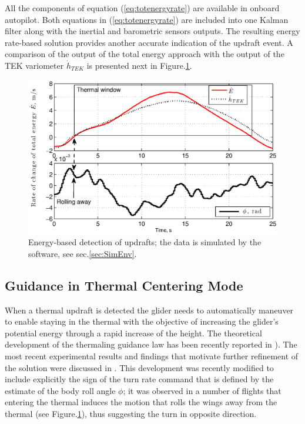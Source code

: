 \documentclass{ifacconf}
\newcommand{\squeezeup}{\vspace{-2.0mm}}
\begin{document}
All the components of equation (\ref{eq:totenergyrate}) are available in
onboard autopilot. Both equations in (\ref{eq:totenergyrate}) are included
into one Kalman filter along with the inertial and barometric sensors
outputs. The resulting energy rate-based solution provides another accurate
indication of the updraft event. A comparison of the output of the total
energy approach with the output of the TEK variometer $\dot{h}_{TEK}$ is
presented next in Figure.\ref{fig:ThermalDetection}.
\begin{figure}[thpb]
  \centering
  \includegraphics[scale=0.44]{Figures/TEK_Bank.eps}
  \caption{Energy-based detection of updrafts; the data is simulated
  by the~\cite{Condor:2013:Online} software, see sec.\ref{sec:SimEnv}.}
  \label{fig:ThermalDetection}
\end{figure}

\subsection{Guidance in Thermal Centering Mode}
\label{subsec:ThermGuidance}
\squeezeup

When a thermal updraft is detected the glider needs to automatically maneuver
to enable staying in the thermal with the objective of increasing the
glider's potential energy through a rapid increase of the height. The
theoretical development of the thermaling guidance law has been recently
reported in \cite{AKlass_JGCD:2012}). The most recent experimental results
and findings that motivate further refinement of the solution were discussed
in \cite{AKlass_CDC:2012}. This development was recently modified to include
explicitly the sign of the turn rate command that is defined by the estimate
of the body roll angle $\phi$; it was observed in a number of flights that
entering the thermal induces the motion that rolls the wings away from the
thermal (see Figure.\ref{fig:ThermalDetection}), thus suggesting the turn in
opposite direction.
\end{document}
